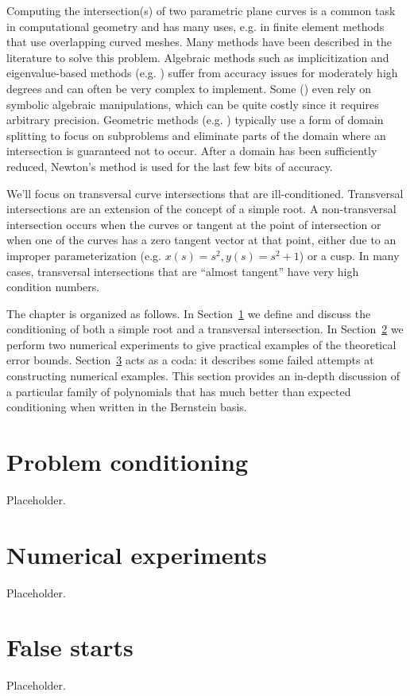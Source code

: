 Computing the intersection(s) of two parametric plane curves is a
common task in computational geometry and has many uses, e.g. in
finite element methods that use overlapping curved meshes. Many
methods have been described in the literature to solve this problem.
Algebraic methods such as implicitization and eigenvalue-based
methods (e.g. \cite{Manocha:CSD-92-698}) suffer
from accuracy issues for moderately high degrees and can often be
very complex to implement. Some (\cite{Bates2008}) even rely on symbolic
algebraic manipulations, which can be quite costly since it requires
arbitrary precision.
Geometric methods (e.g. \cite{Sederberg1986, Sederberg1990, Kim1998})
typically use a form of domain splitting to focus on subproblems and
eliminate parts of the domain where an intersection is guaranteed not
to occur. After a domain has been sufficiently reduced, Newton's method
is used for the last few bits of accuracy.

We'll focus on transversal curve intersections that are ill-conditioned.
Transversal intersections are an extension of the concept of a
simple root. A non-transversal intersection occurs when the curves
or tangent at the point of intersection or when one of the curves
has a zero tangent vector at that point, either due to an improper
parameterization (e.g. \(x(s) = s^2, y(s) = s^2 + 1\)) or a cusp.
In many cases, transversal intersections that are ``almost tangent'' have
very high condition numbers.

The chapter is organized as follows. In Section~\ref{sec:conditioning}
we define and discuss the conditioning of both a simple root and
a transversal intersection. In Section~\ref{sec:compensated-numerical}
we perform two numerical experiments to give practical examples of the
theoretical error bounds. Section~\ref{sec:false-starts} acts as a
coda: it describes some failed attempts at constructing numerical
examples. This section provides an in-depth discussion of a particular
family of polynomials that has much better than expected conditioning
when written in the Bernstein basis.

\section{Problem conditioning}\label{sec:conditioning}

Placeholder.

\section{Numerical experiments}\label{sec:compensated-numerical}

Placeholder.

\section{False starts}\label{sec:false-starts}

Placeholder.

